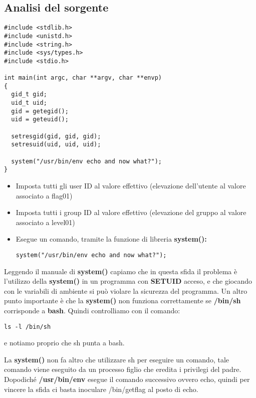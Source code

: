 \subsection{Analisi del sorgente}
\begin{lstlisting}[style=cstyle]
#include <stdlib.h>
#include <unistd.h>
#include <string.h>
#include <sys/types.h>
#include <stdio.h>

int main(int argc, char **argv, char **envp)
{
  gid_t gid;
  uid_t uid;
  gid = getegid();
  uid = geteuid();

  setresgid(gid, gid, gid);
  setresuid(uid, uid, uid);

  system("/usr/bin/env echo and now what?");
}
\end{lstlisting}
\begin{itemize}
    \item Imposta tutti gli user ID al valore effettivo (elevazione dell’utente al valore associato a flag01) 
    \item Imposta tutti i group ID al valore effettivo (elevazione del gruppo al valore associato a level01) 
    \item Esegue un comando, tramite la funzione di libreria \textbf{system():} \begin{lstlisting}[style=cstyle]
        system("/usr/bin/env echo and now what?");
    \end{lstlisting}
\end{itemize}
Leggendo il manuale di \textbf{system()} capiamo che in questa sfida il problema è l’utilizzo della \textbf{system()} in un programma con \textbf{SETUID} acceso, e che giocando con le variabili di ambiente si può violare la sicurezza del programma.
Un altro punto importante è che la \textbf{system()} non funziona correttamente se \textbf{/bin/sh} corrisponde a \textbf{bash}. Quindi controlliamo con il comando: 
\begin{lstlisting}[style=bashstyle]
    ls -l /bin/sh
\end{lstlisting} 
e notiamo proprio che sh punta a bash.

La \textbf{system()} non fa altro che utilizzare sh per eseguire un comando, tale comando viene eseguito da un processo figlio che eredita i privilegi del padre.
Dopodiché \textbf{/usr/bin/env} esegue il comando successivo ovvero echo, quindi per vincere la sfida ci basta inoculare /bin/getflag al posto di echo.

